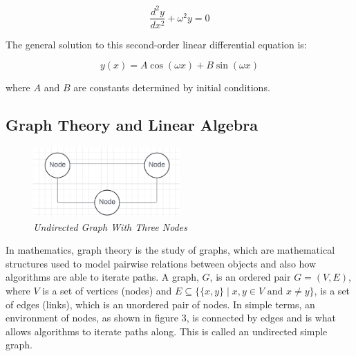 \documentclass[12pt]{article}
\begin{document}
\[
\frac{d^2 y}{dx^2} + \omega^2 y = 0
\]

The general solution to this second-order linear differential equation is:

\[
y(x) = A \cos(\omega x) + B \sin(\omega x)
\]

where \( A \) and \( B \) are constants determined by initial conditions.





\subsection{Graph Theory and Linear Algebra}
\begin{figure}[h!]

  \centering
  \includegraphics[width=0.5\textwidth]{Screenshot 2024-05-16 141959.png}
    \caption{\textit{Undirected Graph With Three Nodes} }
\end{figure}
In mathematics, graph theory is the study of graphs, which are mathematical structures used to model pairwise relations between objects and also how algorithms are able to iterate paths. A graph, \( G \), is an ordered pair \( G = (V, E) \), where \( V \) is a set of vertices (nodes) and \( E \subseteq \{\{x, y\} \mid x, y \in V \text{ and } x \neq y\} \), is a set of edges (links), which is an unordered pair of nodes. In simple terms, an environment of nodes, as shown in figure 3, is connected by edges and is what allows algorithms to iterate paths along. This is called an undirected simple graph.
\end{document}

